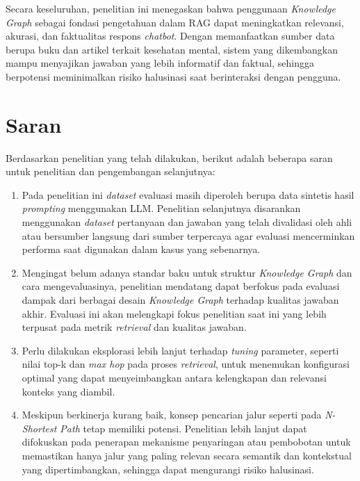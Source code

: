 Secara keseluruhan, penelitian ini menegaskan bahwa penggunaan \textit{Knowledge Graph} sebagai fondasi pengetahuan dalam RAG dapat meningkatkan relevansi, akurasi, dan faktualitas respons \textit{chatbot}.
Dengan memanfaatkan sumber data berupa buku dan artikel terkait kesehatan mental, sistem yang dikembangkan mampu menyajikan jawaban yang lebih informatif dan faktual, sehingga berpotensi meminimalkan risiko halusinasi saat berinteraksi dengan pengguna.

\section{Saran}
Berdasarkan penelitian yang telah dilakukan, berikut adalah beberapa saran untuk penelitian dan pengembangan selanjutnya:

\begin{enumerate}
      \item Pada penelitian ini \textit{dataset} evaluasi masih diperoleh berupa data sintetis hasil \textit{prompting} menggunakan LLM.
            Penelitian selanjutnya disarankan menggunakan \textit{dataset} pertanyaan dan jawaban yang telah divalidasi oleh ahli atau bersumber langsung dari sumber terpercaya agar evaluasi mencerminkan performa saat digunakan dalam kasus yang sebenarnya.

      \item Mengingat belum adanya standar baku untuk struktur \textit{Knowledge Graph} dan cara mengevaluasinya, penelitian mendatang dapat berfokus pada evaluasi dampak dari berbagai desain \textit{Knowledge Graph} terhadap kualitas jawaban akhir.
            Evaluasi ini akan melengkapi fokus penelitian saat ini yang lebih terpusat pada metrik \textit{retrieval} dan kualitas jawaban.

      \item Perlu dilakukan eksplorasi lebih lanjut terhadap \textit{tuning} parameter, seperti nilai top-k dan \textit{max hop} pada proses \textit{retrieval}, untuk menemukan konfigurasi optimal yang dapat menyeimbangkan antara kelengkapan dan relevansi konteks yang diambil.

      \item Meskipun berkinerja kurang baik, konsep pencarian jalur seperti pada \textit{N-Shortest Path} tetap memiliki potensi.
            Penelitian lebih lanjut dapat difokuskan pada penerapan mekanisme penyaringan atau pembobotan untuk memastikan hanya jalur yang paling relevan secara semantik dan kontekstual yang dipertimbangkan, sehingga dapat mengurangi risiko halusinasi.

\end{enumerate}